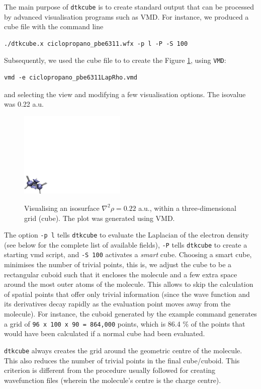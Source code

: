 The main purpose of \texttt{dtkcube} is to create standard output that can be
processed by advanced visualisation programs such as VMD. For instance, we produced
a cube file with the command line
\begin{lstlisting}
./dtkcube.x ciclopropano_pbe6311.wfx -p l -P -S 100
\end{lstlisting}
Subsequently, we used the cube file to to create the Figure \ref{fig:dtkcubeuseex},
using \texttt{VMD}:
\begin{lstlisting}
vmd -e ciclopropano_pbe6311LapRho.vmd
\end{lstlisting}
%
and selecting the view and modifying a few visualisation options. The isovalue was
0.22 a.u.
\begin{figure}[hb!]
\centering
\includegraphics[width=0.45\textwidth]{cyclopLap}\label{fig:cyclopLap}
\caption{Visualising an isosurface $\nabla^2\rho=0.22$ a.u., within a three-dimensional grid (cube). The plot was generated using VMD. }\label{fig:dtkcubeuseex}
\end{figure}
%
The option \texttt{-p l} tells \texttt{dtkcube} to evaluate the Laplacian of the electron density (see below for the complete list of available fields), \texttt{-P} tells
\texttt{dtkcube} to create a starting vmd script, and \texttt{-S 100} activates a \textit{smart} cube. Choosing a smart cube, minimises the number of trivial points, this is, we adjust the cube to be a rectangular cuboid such that it encloses the molecule and a few extra space around the most outer atoms of the molecule. This allows \DTK{} to skip the calculation of spatial points that offer only trivial information (since the wave function and its derivatives decay rapidly as the evaluation point moves away from the molecule). For instance, the cuboid generated by the example command generates a grid of \texttt{96 x 100 x 90 = 864,000} points, which is 86.4 \% of the points that would have been calculated if a normal cube had been evaluated.

\texttt{dtkcube} always creates the grid around the geometric centre of the molecule. This also reduces the number of trivial points in the final cube/cuboid. This criterion is different from
the procedure usually followed for creating wavefunction files (wherein the molecule's centre
is the charge centre).

